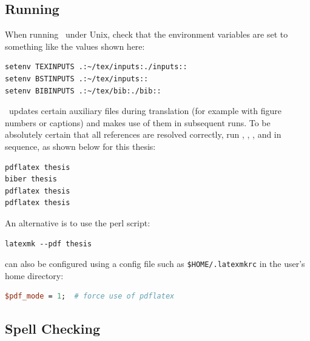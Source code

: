 \subsection{Running \protect\LaTeXe}

When running \LaTeXe\ under Unix, check that the environment variables
are set to something like the values shown here:
\begin{samepage}
\begin{lstlisting}
setenv TEXINPUTS .:~/tex/inputs:./inputs::
setenv BSTINPUTS .:~/tex/inputs::
setenv BIBINPUTS .:~/tex/bib:./bib::
\end{lstlisting}
\end{samepage}


\LaTeXe\ updates certain auxiliary files during translation (for
example with figure numbers or captions) and makes use of them in
subsequent runs. To be absolutely certain that all references are
resolved correctly, run , ,
, and  in sequence, as shown
below for this thesis:
\begin{samepage}
\begin{lstlisting}
pdflatex thesis
biber thesis
pdflatex thesis
pdflatex thesis
\end{lstlisting}
\end{samepage}




An alternative is to use the  perl script:
\begin{samepage}
\begin{lstlisting}
latexmk --pdf thesis
\end{lstlisting}
\end{samepage}


 can also be configured using a config file such as
\lstinline|$HOME/.latexmkrc| in the user's home directory: %
\begin{samepage}
\begin{lstlisting}[language=Perl,]
$pdf_mode = 1;  # force use of pdflatex
\end{lstlisting}   %
\end{samepage}






\subsection{Spell Checking}

